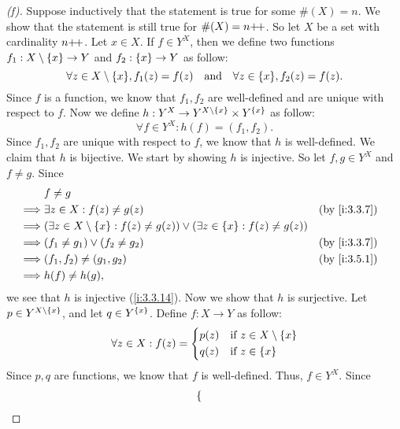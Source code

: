 \begin{proof}[(f)]
  Suppose inductively that the statement is true for some \(\#(X) = n\).
  We show that the statement is still true for \(\#(X) = n{+}\!{+}\).
  So let \(X\) be a set with cardinality \(n{+}\!{+}\).
  Let \(x \in X\).
  If \(f \in Y^X\), then we define two functions \(f_1 : X \setminus \left\lbrace x\right\rbrace \to Y\) and \(f_2 : \left\lbrace x\right\rbrace \to Y\) as follow:
  \[
    \forall z \in X \setminus \set{x}, f_1(z) = f(z) \quad \text{and} \quad \forall z \in \set{x}, f_2(z) = f(z).
  \]
  Since \(f\) is a function, we know that \(f_1, f_2\) are well-defined and are unique with respect to \(f\).
  Now we define \(h : Y^X \to Y^{X \setminus \left\lbrace x\right\rbrace} \times Y^{\left\lbrace x\right\rbrace}\) as follow:
  \[
    \forall f \in Y^X : h(f) = (f_1, f_2).
  \]
  Since \(f_1, f_2\) are unique with respect to \(f\), we know that \(h\) is well-defined.
  We claim that \(h\) is bijective.
  We start by showing \(h\) is injective.
  So let \(f, g \in Y^X\) and \(f \neq g\).
  Since
  \begin{align*}
             & f \neq g                                                                                                             \\
    \implies & \exists z \in X : f(z) \neq g(z)                                                                   &  & \by{i:3.3.7} \\
    \implies & (\exists z \in X \setminus \set{x} : f(z) \neq g(z)) \lor (\exists z \in \set{x} : f(z) \neq g(z))                   \\
    \implies & (f_1 \neq g_1) \lor (f_2 \neq g_2)                                                                 &  & \by{i:3.3.7} \\
    \implies & (f_1, f_2) \neq (g_1, g_2)                                                                         &  & \by{i:3.5.1} \\
    \implies & h(f) \neq h(g),
  \end{align*}
  we see that \(h\) is injective (\cref{i:3.3.14}).
  Now we show that \(h\) is surjective.
  Let \(p \in Y^{X \setminus \left\lbrace x\right\rbrace}\), and let \(q \in Y^{\left\lbrace x\right\rbrace}\).
  Define \(f : X \to Y\) as follow:
  \[
    \forall z \in X : f(z) = \begin{dcases}
      p(z) & \text{if } z \in X \setminus \left\lbrace x\right\rbrace \\
      q(z) & \text{if } z \in \left\lbrace x\right\rbrace
    \end{dcases}
  \]
  Since \(p, q\) are functions, we know that \(f\) is well-defined.
  Thus, \(f \in Y^X\).
  Since
  \begin{align*}
             & \begin{dcases}

\end{dcases}
\end{align*}
\end{proof}
